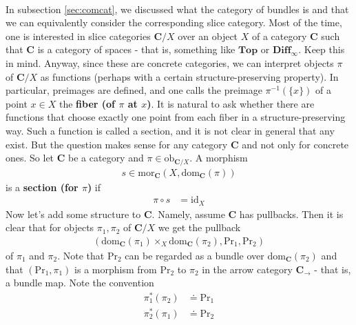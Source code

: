 \\
\begin{exa}[Bundles 1]
\label{exa:bundles1}
In subsection \ref{sec:comcat}, we discussed what the category of bundles is and that we can equivalently consider the corresponding slice category.
Most of the time, one is interested in slice categories $\mathbf{C} \slash X$ over an object $X$ of a category $\mathbf{C}$ such that $\mathbf{C}$ is a category of spaces - that is, something like $\mathbf{Top}$ or $\mathbf{Diff}_{\infty}$.
Keep this in mind.
Anyway, since these are concrete categories, we can interpret objects $\pi$ of $\mathbf{C} \slash X$ as functions (perhaps with a certain structure-preserving property).
In particular, preimages are defined, and one calls the preimage $\pi^{-1}(\lbrace x \rbrace)$ of a point $x \in X$ the \textbf{fiber (of $\pi$ at $x$)}.
It is natural to ask whether there are functions that choose exactly one point from each fiber in a structure-preserving way.
Such a function is called a section, and it is not clear in general that any exist.
But the question makes sense for any category $\mathbf{C}$ and not only for concrete ones.
So let $\mathbf{C}$ be a category and $\pi \in \mathrm{ob}_{\mathbf{C} \slash X}$.
A morphism
\begin{align*}
  s
  \in
  \mathrm{mor}_{\mathbf{C}}
  \left(
    X,
    \mathrm{dom}_{\mathbf{C}}(\pi)
  \right)
\end{align*}
is a \textbf{section (for $\pi$)} if
\begin{align*}
  \pi
  \circ
  s
  &=
  \mathrm{id}_{X}
\end{align*}
Now let's add some structure to $\mathbf{C}$.
Namely, assume $\mathbf{C}$ has pullbacks.
Then it is clear that for objects $\pi_{1},\pi_{2}$ of $\mathbf{C} \slash X$ we get the pullback
\begin{align*}
  \left(
    \mathrm{dom}_{\mathbf{C}}(\pi_{1})
    \times_{X}
    \mathrm{dom}_{\mathbf{C}}(\pi_{2}),
    \mathrm{Pr}_{1},
    \mathrm{Pr}_{2}
  \right)
\end{align*}
of $\pi_{1}$ and $\pi_{2}$.
Note that $\mathrm{Pr}_{2}$ can be regarded as a bundle over $\mathrm{dom}_{\mathbf{C}}(\pi_{2})$ and that $(\mathrm{Pr}_{1},\pi_{1})$ is a morphism from $\mathrm{Pr}_{2}$ to $\pi_{2}$ in the arrow category $\mathbf{C}_{\rightarrow}$ - that is, a bundle map.
Note the convention
\begin{align*}
  \pi_{1}^{\ast}(\pi_{2})
  &\doteq
  \mathrm{Pr}_{1}
  \\
  \pi_{2}^{\ast}(\pi_{1})
  &\doteq
  \mathrm{Pr}_{2}

\end{align*}
\end{exa}
